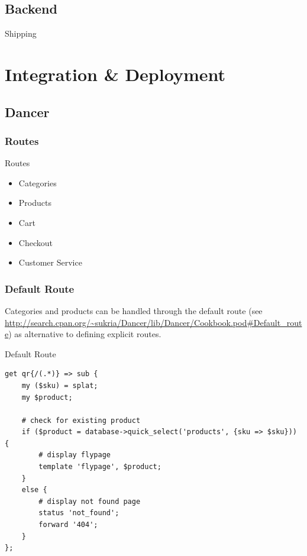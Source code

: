 \subsection{Backend}
\begin{frame}{Shipping}
\end{frame}

\section{Integration \& Deployment}
\subsection{Dancer}
\subsubsection{Routes}
\begin{frame}{Routes}
\begin{itemize}
\item Categories
\item Products
\item Cart
\item Checkout
\item Customer Service
\end{itemize}
\end{frame}

\subsubsection{Default Route}
Categories and products can be handled through the default route
(see
\url{http://search.cpan.org/~sukria/Dancer/lib/Dancer/Cookbook.pod#Default_route})
as alternative to defining explicit routes.

\begin{frame}[fragile]{Default Route}
\begin{lstlisting}
get qr{/(.*)} => sub {
    my ($sku) = splat;
    my $product;

    # check for existing product
    if ($product = database->quick_select('products', {sku => $sku})) {
        # display flypage
        template 'flypage', $product;
    }
    else {
        # display not found page
        status 'not_found';
        forward '404';
    }
};
\end{lstlisting}
\end{frame}


